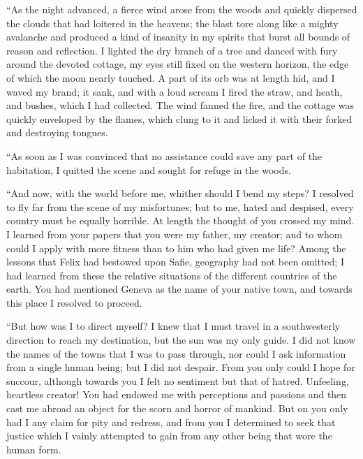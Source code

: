 \documentclass[12pt,openright]{book}
\begin{document}
“As the night advanced, a fierce wind arose from the woods and quickly dispersed the clouds that had loitered in the heavens; the blast tore along like a mighty avalanche and produced a kind of insanity in my spirits that burst all bounds of reason and reflection. I lighted the dry branch of a tree and danced with fury around the devoted cottage, my eyes still fixed on the western horizon, the edge of which the moon nearly touched. A part of its orb was at length hid, and I waved my brand; it sank, and with a loud scream I fired the straw, and heath, and bushes, which I had collected. The wind fanned the fire, and the cottage was quickly enveloped by the flames, which clung to it and licked it with their forked and destroying tongues.

“As soon as I was convinced that no assistance could save any part of the habitation, I quitted the scene and sought for refuge in the woods.

“And now, with the world before me, whither should I bend my steps? I resolved to fly far from the scene of my misfortunes; but to me, hated and despised, every country must be equally horrible. At length the thought of you crossed my mind. I learned from your papers that you were my father, my creator; and to whom could I apply with more fitness than to him who had given me life? Among the lessons that Felix had bestowed upon Safie, geography had not been omitted; I had learned from these the relative situations of the different countries of the earth. You had mentioned Geneva as the name of your native town, and towards this place I resolved to proceed.

“But how was I to direct myself? I knew that I must travel in a southwesterly direction to reach my destination, but the sun was my only guide. I did not know the names of the towns that I was to pass through, nor could I ask information from a single human being; but I did not despair. From you only could I hope for succour, although towards you I felt no sentiment but that of hatred. Unfeeling, heartless creator! You had endowed me with perceptions and passions and then cast me abroad an object for the scorn and horror of mankind. But on you only had I any claim for pity and redress, and from you I determined to seek that justice which I vainly attempted to gain from any other being that wore the human form.
\end{document}
